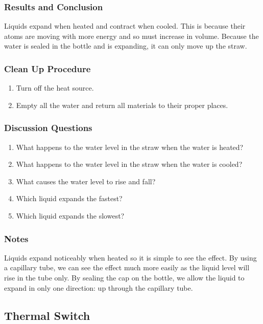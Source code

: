\subsubsection*{Results and Conclusion}
Liquids expand when heated and contract when cooled. This is because their atoms are moving with more energy and so must increase in volume. Because the water is sealed in the bottle and is expanding, it can only move up the straw.  

\subsubsection*{Clean Up Procedure}
\begin{enumerate}
\item{Turn off the heat source.} 
\item{Empty all the water and return all materials to their proper places.} 
\end{enumerate}

\subsubsection*{Discussion Questions}
\begin{enumerate}
\item{What happens to the water level in the straw when the water is heated?}
\item{What happens to the water level in the straw when the water is cooled?}
\item{What causes the water level to rise and fall?}
\item{Which liquid expands the fastest?}
\item{Which liquid expands the slowest?}
\end{enumerate}

\subsubsection*{Notes}
Liquids expand noticeably when heated so it is simple to see the effect. By using a capillary tube, we can see the effect much more easily as the liquid level will rise in the tube only. By sealing the cap on the bottle, we allow the liquid to expand in only one direction: up through the capillary tube.  

\subsection{Thermal Switch}

